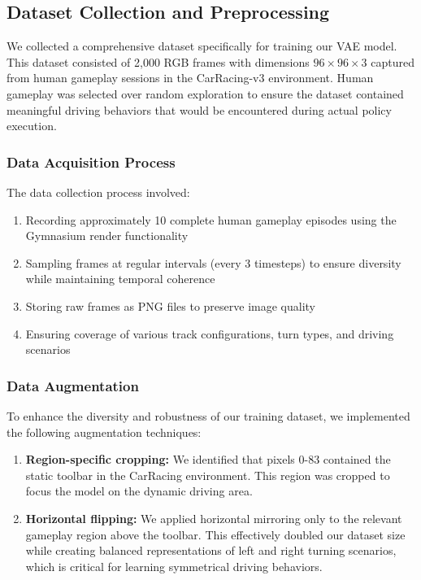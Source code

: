 \documentclass[conference]{IEEEtran}
\begin{document}
\subsection{Dataset Collection and Preprocessing}

We collected a comprehensive dataset specifically for training our VAE model. This dataset consisted of 2,000 RGB frames with dimensions $96 \times 96 \times 3$ captured from human gameplay sessions in the CarRacing-v3 environment. Human gameplay was selected over random exploration to ensure the dataset contained meaningful driving behaviors that would be encountered during actual policy execution.

\subsubsection{Data Acquisition Process}
The data collection process involved:
\begin{enumerate}[label=\roman*.]
    \item Recording approximately 10 complete human gameplay episodes using the Gymnasium render functionality
    \item Sampling frames at regular intervals (every 3 timesteps) to ensure diversity while maintaining temporal coherence
    \item Storing raw frames as PNG files to preserve image quality
    \item Ensuring coverage of various track configurations, turn types, and driving scenarios
\end{enumerate}

\subsubsection{Data Augmentation}
To enhance the diversity and robustness of our training dataset, we implemented the following augmentation techniques:
\begin{enumerate}[label=\roman*.]
    \item \textbf{Region-specific cropping:} We identified that pixels 0-83 contained the static toolbar in the CarRacing environment. This region was cropped to focus the model on the dynamic driving area.
    
    \item \textbf{Horizontal flipping:} We applied horizontal mirroring only to the relevant gameplay region above the toolbar. This effectively doubled our dataset size while creating balanced representations of left and right turning scenarios, which is critical for learning symmetrical driving behaviors.
\end{enumerate}
\end{document}
